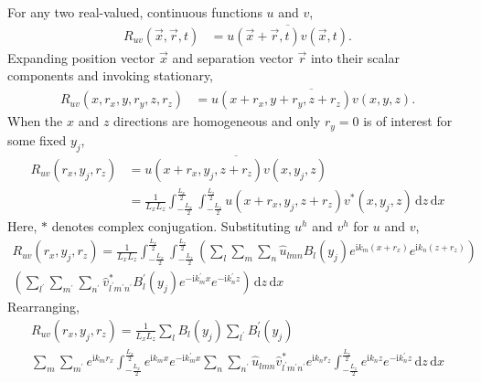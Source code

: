 \documentclass[letterpaper,11pt,nointlimits,reqno]{amsart}
\newcommand{\ii}{\ensuremath{\mathrm{i}}}
\begin{document}
For any two real-valued, continuous functions $u$ and $v$,
\begin{align}
R_{uv} \left( \vec{x}, \vec{r}, t \right)
  &=   \overline{
       u \left( \vec{x}+ \vec{r}, t \right)
       v \left( \vec{x}         , t \right)
       }
       .
\end{align}
Expanding position vector $\vec{x}$ and separation vector $\vec{r}$ into their
scalar components and invoking stationary,
\begin{align}
R_{uv} \left( x, r_x, y, r_y, z, r_z \right)
  &=   \overline{
       u \left( x + r_x, y + r_y, z + r_z \right)
       v \left( x      , y      , z       \right)
       }
       .
\end{align}
When the $x$ and $z$ directions are homogeneous and only $r_y=0$ is of interest
for some fixed $y_j$,
\begin{align}
R_{uv} \left( r_x, y_j, r_z \right)
  &=   \overline{
       u \left( x + r_x, y_j, z + r_z \right)
       v \left( x      , y_j, z       \right)
       }
\\
  &= \frac{1}{L_x L_z}
     \int_{-\frac{L_x}{2}}^{\frac{L_x}{2}}
     \int_{-\frac{L_z}{2}}^{\frac{L_z}{2}}
       u      \left( x + r_x, y_j, z + r_z \right)
       v^\ast \left( x      , y_j, z       \right)
     \,\mathrm{d}z
     \,\mathrm{d}x
\end{align}
Here, $\ast$ denotes complex conjugation.  Substituting $u^h$ and $v^h$ for $u$
and $v$,
\begin{multline}
R_{uv} \left( r_x, y_j, r_z \right)
   = \frac{1}{L_x L_z}
     \int_{-\frac{L_x}{2}}^{\frac{L_x}{2}}
     \int_{-\frac{L_z}{2}}^{\frac{L_z}{2}}
        \left(
         \sum_{l}\sum_{m}\sum_{n}
         \hat{u}_{l m n}B_l\left(y_j\right)
         e^{\ii k_m \left(x+r_x\right)}e^{\ii k_n \left(z+r_z\right)}
       \right)
       \\
       \left(
         \sum_{l^\prime}\sum_{m^\prime}\sum_{n^\prime}
         \hat{v}^\ast_{l^\prime m^\prime n^\prime} B_l^\prime\left(y_j\right)
         e^{-\ii k_m^\prime x}e^{-\ii k_n^\prime z}
       \right)
     \,\mathrm{d}z
     \,\mathrm{d}x
\end{multline}
Rearranging,
\begin{multline}
R_{uv} \left( r_x, y_j, r_z \right)
   = \frac{1}{L_x L_z}
     \sum_{l} B_l\left(y_j\right)
     \sum_{l^\prime} B_l^\prime\left(y_j\right)
     \\
     \sum_{m}
     \sum_{m^\prime}
     e^{\ii k_m r_x}
     \int_{-\frac{L_x}{2}}^{\frac{L_x}{2}}
     e^{\ii k_m x  }
     e^{-\ii k_m^\prime x}
     \sum_{n}
     \sum_{n^\prime}
     \hat{u}_{l m n}
     \hat{v}^\ast_{l^\prime m^\prime n^\prime}
     e^{\ii k_n r_z}
     \int_{-\frac{L_z}{2}}^{\frac{L_z}{2}}
     e^{\ii k_n z  }
     e^{-\ii k_n^\prime z}
     \,\mathrm{d}z
     \,\mathrm{d}x
\end{multline}
\end{document}
